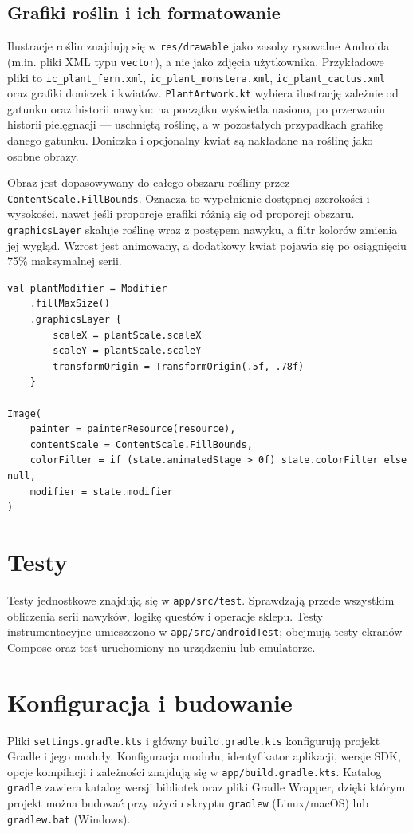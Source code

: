 \documentclass[a4paper,12pt]{article}
\begin{document}
\subsection{Grafiki roślin i ich formatowanie}
Ilustracje roślin znajdują się w \texttt{res/drawable} jako zasoby rysowalne Androida (m.in. pliki XML typu \texttt{vector}), a nie jako zdjęcia użytkownika. Przykładowe pliki to \texttt{ic\_plant\_fern.xml}, \texttt{ic\_plant\_monstera.xml}, \texttt{ic\_plant\_cactus.xml} oraz grafiki doniczek i kwiatów. \texttt{PlantArtwork.kt} wybiera ilustrację zależnie od gatunku oraz historii nawyku: na początku wyświetla nasiono, po przerwaniu historii pielęgnacji --- uschniętą roślinę, a w pozostałych przypadkach grafikę danego gatunku. Doniczka i opcjonalny kwiat są nakładane na roślinę jako osobne obrazy.

Obraz jest dopasowywany do całego obszaru rośliny przez \texttt{ContentScale.FillBounds}. Oznacza to wypełnienie dostępnej szerokości i wysokości, nawet jeśli proporcje grafiki różnią się od proporcji obszaru. \texttt{graphicsLayer} skaluje roślinę wraz z postępem nawyku, a filtr kolorów zmienia jej wygląd. Wzrost jest animowany, a dodatkowy kwiat pojawia się po osiągnięciu 75\% maksymalnej serii.

\begin{verbatim}
val plantModifier = Modifier
    .fillMaxSize()
    .graphicsLayer {
        scaleX = plantScale.scaleX
        scaleY = plantScale.scaleY
        transformOrigin = TransformOrigin(.5f, .78f)
    }

Image(
    painter = painterResource(resource),
    contentScale = ContentScale.FillBounds,
    colorFilter = if (state.animatedStage > 0f) state.colorFilter else null,
    modifier = state.modifier
)
\end{verbatim}

\section{Testy}
Testy jednostkowe znajdują się w \texttt{app/src/test}. Sprawdzają przede wszystkim obliczenia serii nawyków, logikę questów i operacje sklepu. Testy instrumentacyjne umieszczono w \texttt{app/src/androidTest}; obejmują testy ekranów Compose oraz test uruchomiony na urządzeniu lub emulatorze.

\section{Konfiguracja i budowanie}
Pliki \texttt{settings.gradle.kts} i główny \texttt{build.gradle.kts} konfigurują projekt Gradle i jego moduły. Konfiguracja modułu, identyfikator aplikacji, wersje SDK, opcje kompilacji i zależności znajdują się w \texttt{app/build.gradle.kts}. Katalog \texttt{gradle} zawiera katalog wersji bibliotek oraz pliki Gradle Wrapper, dzięki którym projekt można budować przy użyciu skryptu \texttt{gradlew} (Linux/macOS) lub \texttt{gradlew.bat} (Windows).
\end{document}
